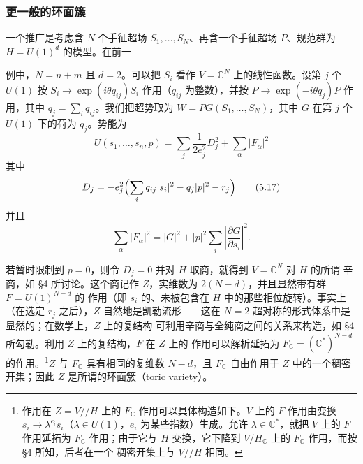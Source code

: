 \subsubsection*{更一般的环面簇}

一个推广是考虑含 $N$ 个手征超场 $S_1,\dots,S_N$、再含一个手征超场 $P$、规范群为
$H=U(1)^d$ 的模型。在前一

\label{op:56}
例中，$N=n+m$ 且 $d=2$。可以把 $S_i$ 看作 $V=\mathbb{C}^N$ 上的线性函数。设第 $j$ 个
$U(1)$ 按 $S_i\to\exp(i\theta q_{ij})S_i$ 作用（$q_{ij}$ 为整数），并按
$P\to\exp(-i\theta q_j)P$ 作用，其中 $q_j=\sum_i q_{ij}$。我们把超势取为
$W=PG(S_1,\dots,S_N)$，其中 $G$ 在第 $j$ 个 $U(1)$ 下的荷为 $q_j$。势能为
\begin{equation}
U(s_1,\dots,s_n,p)=\sum_j\frac{1}{2e_j^2}D_j^2+\sum_\alpha|F_\alpha|^2
\tag{5.16}
\end{equation}
其中
\begin{equation}
D_j=-e_j^2\Bigl(\sum_iq_{ij}|s_i|^2-q_j|p|^2-r_j\Bigr)
\tag{5.17}
\end{equation}
并且
\begin{equation}
\sum_\alpha|F_\alpha|^2=|G|^2+|p|^2\sum_i\left|\frac{\partial G}{\partial s_i}\right|^2.
\tag{5.18}
\end{equation}

若暂时限制到 $p=0$，则令 $D_j=0$ 并对 $H$ 取商，就得到 $V=\mathbb{C}^N$ 对 $H$ 的所谓
辛商，如 §4 所讨论。这个商记作 $Z$，实维数为 $2(N-d)$，并且显然带有群 $F=U(1)^{N-d}$ 的
作用（即 $s_i$ 的、未被包含在 $H$ 中的那些相位旋转）。事实上（在选定 $r_j$ 之后），$Z$
自然地是凯勒流形——这在 $N=2$ 超对称的形式体系中是显然的；在数学上，$Z$ 上的复结构
可利用辛商与全纯商之间的关系来构造，如 §4 所勾勒。利用 $Z$ 上的复结构，$F$ 在 $Z$ 上的
作用可以解析延拓为 $F_{\mathbb{C}}=(\mathbb{C}^*)^{N-d}$ 的作用。\footnote{作用在
$Z=V//H$ 上的 $F_{\mathbb{C}}$ 作用可以具体构造如下。$V$ 上的 $F$ 作用由变换
$s_i\to\lambda^{e_i}s_i$（$\lambda\in U(1)$，$e_i$ 为某些指数）生成。允许
$\lambda\in\mathbb{C}^*$，就把 $V$ 上的 $F$ 作用延拓为 $F_{\mathbb{C}}$ 作用；由于它与 $H$
交换，它下降到 $V/H_{\mathbb{C}}$ 上的 $F_{\mathbb{C}}$ 作用，而按 §4 所知，后者在一个
稠密开集上与 $V//H$ 相同。}$Z$ 与 $F_{\mathbb{C}}$ 具有相同的复维数 $N-d$，且
$F_{\mathbb{C}}$ 自由作用于 $Z$ 中的一个稠密开集；因此 $Z$ 是所谓的环面簇（toric variety）。


